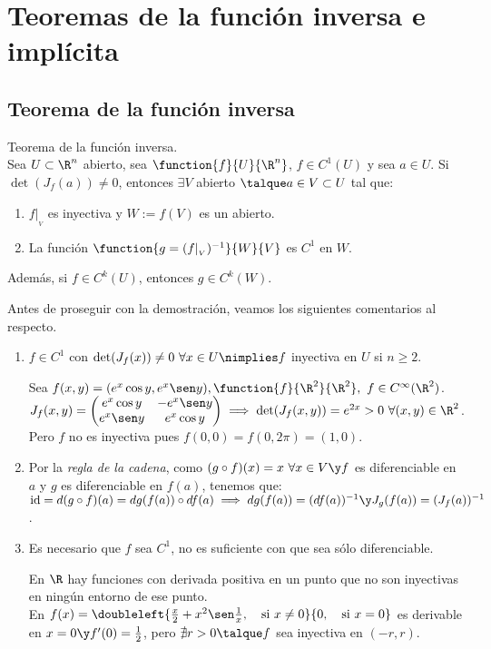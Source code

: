 \chapter{Teoremas de la función inversa e implícita}
\section{Teorema de la función inversa}

\begin{teor} Teorema de la función inversa.\\
	Sea $U\subset\R^n$ abierto, sea $\function{f}{U}{\R^n}$, $f\in C^1(U)$ y sea $a\in U$. Si $\det(J_f(a))\neq 0$, entonces $\exists V$ abierto $\talque a\in V\subset U$ tal que:
	\begin{enumerate}[1)]
	\item $f|_{_V}$ es inyectiva y $W:=f(V)$ es un abierto.
	\item La función $\function{g=(f|_{_V})^{-1}}{W}{V}$ es $C^1$ en $W$.
	\end{enumerate}
	Además, si $f\in C^k(U)$, entonces $g\in C^k(W)$.
	\end{teor}
	
	\begin{observacion} Antes de proseguir con la demostración, veamos los siguientes comentarios al respecto.
	\begin{enumerate}[1)]
	\item $f\in C^1$ con $\det(J_f(x))\neq 0\ \forall x\in U\nimplies f$ inyectiva en $U$ si $n\geq 2$.
	\begin{ejem} Sea $f(x,y)=(e^x\cos y,e^x\sen y),\function{f}{\R^2}{\R^2},\ f\in C^\infty(\R^2)$.\\
	$J_f(x,y)=\begin{pmatrix}e^x\cos y&-e^x\sen y\\e^x\sen y&e^x\cos y\end{pmatrix}\implies\det(J_f(x,y))=e^{2x}>0\ \forall(x,y)\in\R^2$.\\
	Pero $f$ no es inyectiva pues $f(0,0)=f(0,2\pi)=(1,0)$.
	\end{ejem}
	\item Por la \textit{regla de la cadena}, como $(g\circ f)(x)=x\ \forall x\in V\y f$ es diferenciable en $a$ y $g$ es diferenciable en $f(a)$, tenemos que:\\
	$\mathrm{id}=d(g\circ f)(a)=dg(f(a))\circ df(a)\implies dg(f(a))=(df(a))^{-1}\y J_g(f(a))=(J_f(a))^{-1}$.
	\item Es necesario que $f$ sea $C^1$, no es suficiente con que sea sólo diferenciable.
	\begin{ejem} En $\R$ hay funciones con derivada positiva en un punto que no son inyectivas en ningún entorno de ese punto.\\
	En $f(x)=\doubleleft{\frac{x}{2}+x^2\sen\frac{1}{x},\ \ \ \mathrm{si\ }x\neq 0}{0,\ \ \ \mathrm{si\ }x= 0}$ es derivable en $x=0\y f'(0)=\frac{1}{2}$, pero $\nexists r>0\talque f$ sea inyectiva en $(-r,r)$.
	\end{ejem}
	\end{enumerate}
	\end{observacion}
	

